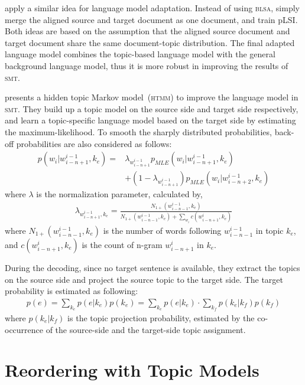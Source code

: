 \cite{Ruiz-2011} apply a similar idea for language model
adaptation. Instead of using \textsc{blsa}, \cite{Ruiz-2011} simply
merge the aligned source and target document as one document, and
train pLSI. Both ideas are
based on the assumption that the aligned source document and target
document share the same document-topic distribution. The final adapted
language model combines the topic-based language model with the
general background language model, thus it is more robust in improving
the results of \textsc{smt}.


\citet{Yu-2013} presents a hidden topic Markov model~(\textsc{htmm}) to improve
the language model in \textsc{smt}. They build up a topic model on the
source side and target side respectively, and learn a topic-specific
language model based on the target side by estimating the
maximum-likelihood. To smooth the sharply distributed probabilities,
back-off probabilities are also considered as follows:
\begin{align}
p(w_i | w^{i-1}_{i-n+1}, k_e) = &\lambda_{w^{i-1}_{i-n+1}} p_{MLE}(w_i|w^{i-1}_{i-n+1}, k_e) \\
&+ (1- \lambda_{w^{i-1}_{i-n+1}})p_{MLE}(w_i|w^{i-1}_{i-n+2}, k_e)
\end{align}
where $\lambda$ is the normalization parameter, calculated by,
\begin{align}
\lambda_{w^{i-1}_{i-n+1}, k_e} = \frac{N_{1+}(w^{i-1}_{i-n-1},
  k_e)}{N_{1+}(w^{i-1}_{i-n-1}, k_e) + \sum_{w_i}c(w^i_{i-n+1}, k_e)}
\end{align}
where $N_{1+}(w^{i-1}_{i-n-1}, k_e)$ is the number of words following
$w^{i-1}_{i-n-1}$ in topic $k_e$, and $c(w^i_{i-n+1}, k_e)$ is the
count of n-gram $w^i_{i-n+1}$ in $k_e$.

During the decoding, since no target sentence is available, they extract the topics on the 
source side and project the source topic to the target side. 
The target probability is estimated as following:
\begin{align}
p(e) = \sum_{k_e} p(e|k_e) p(k_e) = \sum_{k_e} p(e|k_e) \cdot \sum_{k_f} p(k_e|k_f) p (k_f)
\end{align}
where $p(k_e|k_f)$ is the topic projection probability, estimated by
the co-occurrence of the source-side and the target-side topic assignment.


\section{Reordering with Topic Models}

